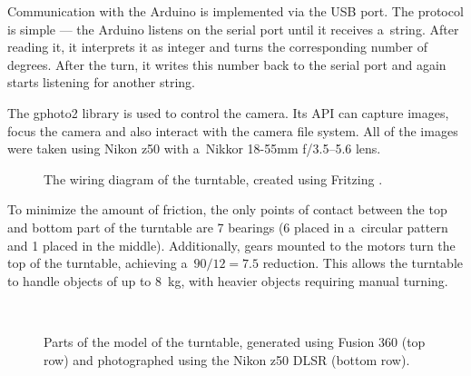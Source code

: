 Communication with the Arduino is implemented via the USB port.
The protocol is simple --- the Arduino listens on the serial port until it receives a~string.
After reading it, it interprets it as integer and turns the corresponding number of degrees.
After the turn, it writes this number back to the serial port and again starts listening for another string.

The gphoto2 \cite{gphoto2} library is used to control the camera.
Its API can capture images, focus the camera and also interact with the camera file system.
All of the images were taken using Nikon z50 with a~Nikkor 18-55mm f/3.5--5.6 lens.

\begin{figure}[!b]
	\centering
	
	\caption{The wiring diagram of the turntable, created using Fritzing \cite{fritzing}.}
	\label{fig:wiring}
\end{figure}

To minimize the amount of friction, the only points of contact between the top and bottom part of the turntable are 7 bearings (6 placed in a~circular pattern and 1 placed in the middle).
Additionally, gears mounted to the motors turn the top of the turntable, achieving a~$90/12 = 7.5$ reduction.
This allows the turntable to handle objects of up to \SI{8}{\kilo\gram}, with heavier objects requiring manual turning.

\begin{figure}[t]
	\centering
	\hfill
	\hfill
	\\
	\hfill
	\hfill
	\hspace{1.2em}
	\caption{Parts of the model of the turntable, generated using Fusion 360 (top row) and photographed using the Nikon z50 DLSR (bottom row). }%
	\label{fig:turntable}
\end{figure}

